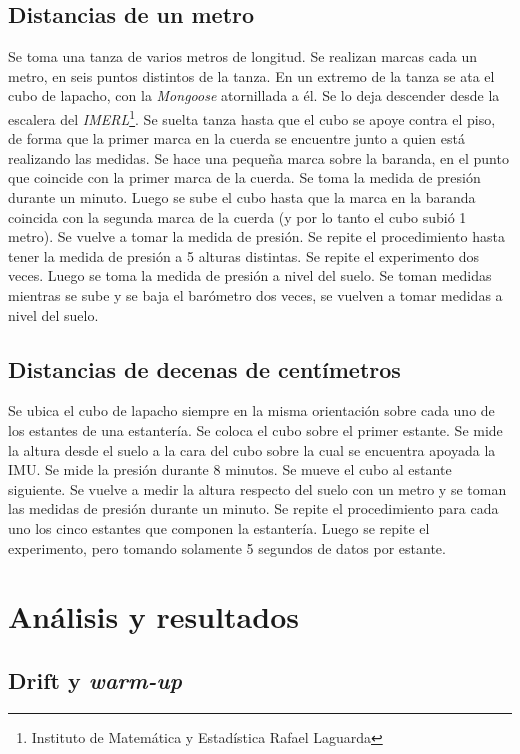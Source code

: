 \documentclass[spanish,12pt,a4paper,titlepage]{report}
\begin{document}
\subsection{Distancias de un metro}

Se toma una tanza de varios metros de longitud. Se realizan marcas cada un metro, en seis puntos distintos de la tanza. En un extremo de la tanza se ata el cubo de lapacho, con la \emph{Mongoose} atornillada a él. Se lo deja descender desde la escalera del \emph{IMERL}\footnote{Instituto de Matemática y Estadística Rafael Laguarda}. Se suelta tanza hasta que el cubo se apoye contra el piso, de forma que la primer marca en la cuerda se encuentre junto a quien está realizando las medidas. Se hace una pequeña marca sobre la baranda, en el punto que coincide con la primer marca de la cuerda. Se toma la medida de presión durante un minuto. Luego se sube el cubo hasta que la marca en la baranda coincida con la segunda marca de la cuerda (y por lo tanto el cubo subió 1 metro). Se vuelve a tomar la medida de presión. Se repite el procedimiento hasta tener la medida de presión a 5 alturas distintas. 
Se repite el experimento dos veces. Luego se toma la medida de presión a nivel del suelo. Se toman medidas mientras se sube y se baja el barómetro dos veces, se vuelven a tomar medidas a nivel del suelo.
\subsection{Distancias de decenas de centímetros}

Se ubica el cubo de lapacho siempre en la misma orientación sobre cada uno de los estantes de una estantería. Se coloca el cubo sobre el primer estante. Se mide la altura desde el suelo a la cara del cubo sobre la cual se encuentra apoyada la IMU. Se mide la presión durante 8 minutos. Se mueve el cubo al estante siguiente. Se vuelve a medir la altura respecto del suelo con un metro y se toman las medidas de presión durante un minuto. Se repite el procedimiento para cada uno los cinco estantes que componen la estantería. Luego se repite el experimento, pero tomando solamente 5 segundos de datos por estante.

\newpage
\section{Análisis y resultados}

\subsection{Drift y \textit{warm-up}}
\label{sec:drift-y-warm-up}
\end{document}
